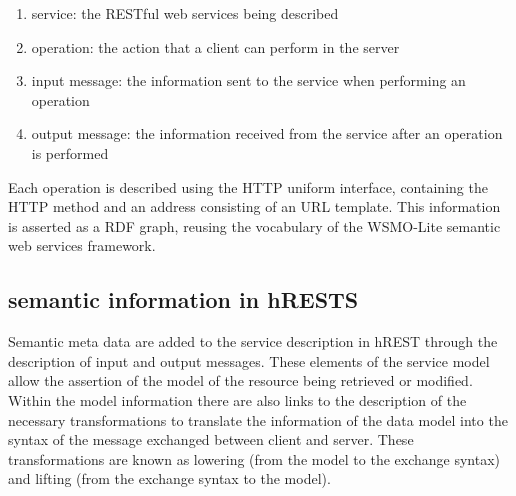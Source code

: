 \begin{enumerate}
  \item service: the RESTful web services being described
  \item operation: the action that a client can perform in the server
  \item input message: the information sent to the service when performing an operation
  \item output message: the information received from the service after an operation is performed
\end{enumerate}

Each operation is described using the HTTP uniform interface, containing the HTTP method and an address consisting of an URL template. This information is asserted as a RDF graph, reusing the vocabulary of the WSMO-Lite semantic web services framework.

\subsection{semantic information in hRESTS}
Semantic meta data are added to the service description in hREST through the description of input and output messages. These elements of the service model allow the assertion of the model of the resource being retrieved or modified.\\
Within the model information there are also links to the description of the necessary transformations to translate the information of the data model into the syntax of the message exchanged between client and server. These transformations are known as lowering (from the model to the exchange syntax) and lifting (from the exchange syntax to the model).

